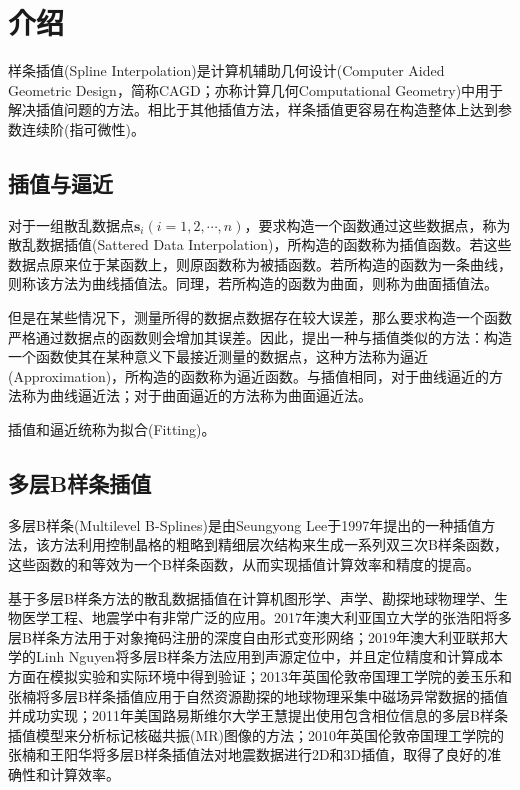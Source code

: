 \section{介绍}
样条插值(Spline Interpolation)是计算机辅助几何设计(Computer Aided Geometric Design，简称CAGD；亦称计算几何Computational Geometry\textsuperscript{\cite{farin1999nurbs}})中用于解决插值问题的方法\textsuperscript{\cite{施法中2013计算机辅助几何设计与非均匀有理}}。相比于其他插值方法，样条插值更容易在构造整体上达到参数连续阶(指可微性)。

\subsection{插值与逼近}
对于一组散乱数据点$ \mathbf{s}_{i} \left( i=1,2,\cdots,n \right) $，要求构造一个函数通过这些数据点，称为散乱数据插值(Sattered Data Interpolation)\textsuperscript{\cite{franke1982scattered}}，所构造的函数称为插值函数。若这些数据点原来位于某函数上，则原函数称为被插函数。若所构造的函数为一条曲线，则称该方法为曲线插值法。同理，若所构造的函数为曲面，则称为曲面插值法。

但是在某些情况下，测量所得的数据点数据存在较大误差，那么要求构造一个函数严格通过数据点的函数则会增加其误差。因此，提出一种与插值类似的方法：构造一个函数使其在某种意义下最接近测量的数据点，这种方法称为逼近(Approximation)，所构造的函数称为逼近函数。与插值相同，对于曲线逼近的方法称为曲线逼近法；对于曲面逼近的方法称为曲面逼近法。

插值和逼近统称为拟合(Fitting)。

\subsection{多层B样条插值}
多层B样条(Multilevel B-Splines)是由Seungyong Lee于1997年提出的一种插值方法\textsuperscript{\cite{lee1997scattered}}，该方法利用控制晶格的粗略到精细层次结构来生成一系列双三次B样条函数，这些函数的和等效为一个B样条函数，从而实现插值计算效率和精度的提高。

基于多层B样条方法的散乱数据插值在计算机图形学、声学、勘探地球物理学、生物医学工程、地震学中有非常广泛的应用。2017年澳大利亚国立大学的张浩阳将多层B样条方法用于对象掩码注册的深度自由形式变形网络\textsuperscript{\cite{Zhang2017deep}}；2019年澳大利亚联邦大学的Linh Nguyen将多层B样条方法应用到声源定位中，并且定位精度和计算成本方面在模拟实验和实际环境中得到验证\textsuperscript{\cite{Nguyen2019SSL}}；2013年英国伦敦帝国理工学院的姜玉乐和张楠将多层B样条插值应用于自然资源勘探的地球物理采集中磁场异常数据的插值并成功实现\textsuperscript{\cite{Jiang2013MA}}；2011年美国路易斯维尔大学王慧提出使用包含相位信息的多层B样条插值模型来分析标记核磁共振(MR)图像的方法\textsuperscript{\cite{wang2011Cardiac}}；2010年英国伦敦帝国理工学院的张楠和王阳华将多层B样条插值法对地震数据进行2D和3D插值，取得了良好的准确性和计算效率\textsuperscript{\cite{zhang2010SR}}。